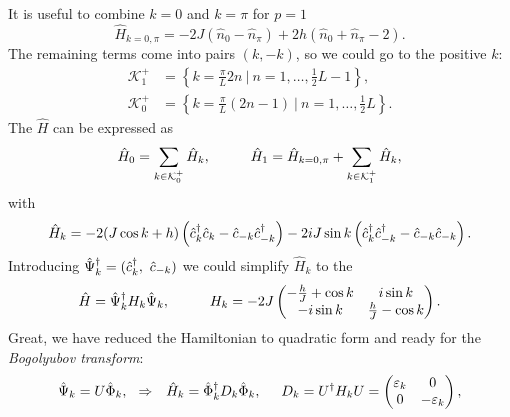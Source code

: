 It is useful to combine $k=0$ and $k=\pi$ for $p=1$
\begin{equation*}
	\hat{H}_{k=0,\pi} = - 2J (\hat{n}_0 - \hat{n}_\pi) + 2 h (\hat{n}_0 + \hat{n}_{\pi} - 2).
\end{equation*}
The remaining terms come into pairs $(k,-k)$, so we could go to the positive $k$:
\begin{align*}
	\mathcal K_1^+ &= \left\{
		k =  \frac{ \pi }{L}2n\ \big| \  n= 1,\ldots,\tfrac{1}{2}L-1
	\right\}, \\
	\mathcal K_0^+ &= \left\{
		k =  \frac{ \pi }{L}(2n-1) \ \big| \  n= 1,\ldots,\tfrac{1}{2}L
	\right\}.
\end{align*}
The $\hat{H}$ can be expressed as
\begin{equation*}
	\hat{H}_0 = \sum_{k \in \mathcal K_0^+} \hat{H}_k,
	\hspace{10 mm} 
	\hat{H}_1 = \hat{H}_{k=0,\pi} +  \sum_{k \in \mathcal K_1^+} \hat{H}_k,
\end{equation*}
with
\begin{equation*}
	\hat{H}_k = -2(J \cos k + h) \left(\hat{c}_k^{\dag} \hat{c}_k - \hat{c}_{-k} \hat{c}_{-k}^{\dag}\right) - 2 i J \sin k \left(
		\hat{c}_{k}^{\dag} \hat{c}_{-k}^{\dag} - \hat{c}_{-k} \hat{c}_{-k}
	\right).
\end{equation*}
Introducing $\hat{\Psi}\D_k = (\hat{c}_k\D,\ \hat{c}_{-k})$ we could simplify $\hat{H}_k$ to the
\begin{equation*}
	\hat{H} = \hat{\Psi}_k\D H_k \hat{\Psi}_k,
	\hspace{10 mm} 
	H_k = -2 J\begin{pmatrix}
	    -\tfrac{h}{J} + \cos k &  i \sin k \\
	    -  i \sin k & \tfrac{h}{J} - \cos k \\
	\end{pmatrix}.
\end{equation*}
Great, we have reduced the Hamiltonian to quadratic form and ready for the \textit{Bogolyubov transform}:
\begin{equation*}
	\hat{\Psi}_k = U \hat{\Phi}_k,
	\hspace{0.25cm} \Rightarrow \hspace{0.25cm}
	\hat{H}_k = \hat{\Phi}_k^{\dag} D_k \hat{\Phi}_k,
	\hspace{5 mm} 
	D_k = U^{\dag} H_k U = \begin{pmatrix}
	    \varepsilon_k & 0 \\
	    0 & -\varepsilon_k \\
	\end{pmatrix},
\end{equation*}

